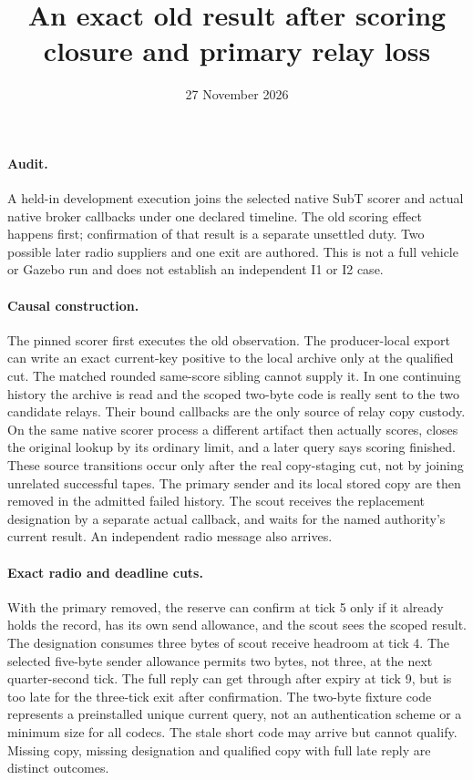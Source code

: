 \documentclass[11pt]{article}
\title{An exact old result after scoring closure and primary relay loss}
\date{27 November 2026}
\begin{document}
\maketitle
\paragraph{Audit.}
A held-in development execution joins the selected native
SubT scorer and actual native broker callbacks under one
declared timeline. The old scoring effect happens first;
confirmation of that result is a separate unsettled duty.
Two possible later radio suppliers and one exit are authored.
This is not a full vehicle or Gazebo run and does not establish
an independent I1 or I2 case.

\paragraph{Causal construction.}
The pinned scorer first executes the old observation. The
producer-local export can write an exact current-key positive
to the local archive only at the qualified cut. The matched
rounded same-score sibling cannot supply it. In one continuing
history the archive is read and the scoped two-byte code is
really sent to the two candidate relays. Their bound callbacks
are the only source of relay copy custody. On the same native
scorer process a different artifact then actually scores,
closes the original lookup by its ordinary limit, and a later
query says scoring finished. These source transitions occur
only after the real copy-staging cut, not by joining unrelated
successful tapes. The primary sender and its local stored
copy are then removed in the admitted failed history.
The scout receives the replacement designation by a separate
actual callback, and waits for the named authority's current
result. An independent radio message also arrives.

\paragraph{Exact radio and deadline cuts.}
With the primary removed, the reserve can confirm at tick 5
only if it already holds the record, has its own send
allowance, and the scout sees the scoped result.
The designation consumes three bytes of scout receive
headroom at tick 4. The selected five-byte sender allowance
permits two bytes, not three, at the next quarter-second tick.
The full reply can get through after expiry at tick 9, but is
too late for the three-tick exit after confirmation. The
two-byte fixture code represents a preinstalled unique
current query, not an authentication scheme or a minimum
size for all codecs. The stale short code may arrive but
cannot qualify. Missing copy, missing designation and
qualified copy with full late reply are distinct outcomes.
\end{document}
